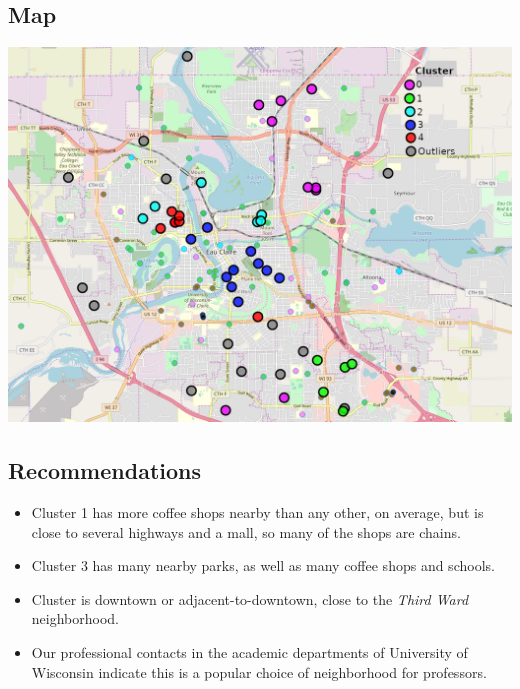 \documentclass{beamer}
\begin{document}
\subsection{Map}
\begin{frame}
    \begin{center}
        \vspace{-0.5cm}
        \hspace{-1.25cm}
        \includegraphics[scale=0.42]{Clusters.png}
        \vspace{1cm}
    \end{center}
\end{frame}

\subsection{Recommendations}
\begin{frame}
    \begin{itemize}
        \item Cluster 1 has more coffee shops nearby than any other, on average, but is close to several highways and a mall, so many of the shops are chains. \pause
        \item Cluster 3 has many nearby parks, as well as many coffee shops and schools. 
        \item Cluster is downtown or adjacent-to-downtown, close to the {\em Third Ward} neighborhood.
        \item  Our professional contacts in the academic departments of University of Wisconsin indicate this is a popular choice of neighborhood for professors. 
    \end{itemize}
\end{frame}
\end{document}
